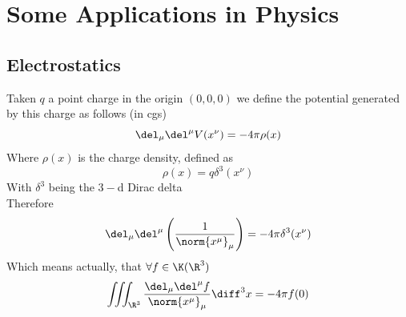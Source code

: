 \documentclass[../mmf.tex]{subfiles}
\begin{document}
\section{Some Applications in Physics}
\subsection{Electrostatics}
\begin{eg}
	Taken $q$ a point charge in the origin $(0,0,0)$ we define the potential generated by this charge as follows (in cgs)
	\begin{equation*}
		\del_\mu\del^\mu V(x^\nu)=-4\pi\rho(x)
	\end{equation*}
	Where $\rho(x)$ is the charge density, defined as
	\begin{equation*}
		\rho(x)=q\delta^3(x^\nu)
	\end{equation*}
	With $\delta^3$ being the $3-$d Dirac delta\\
	Therefore
	\begin{equation*}
		\del_\mu\del^\mu\left( \frac{1}{\norm{x^\mu}_\mu} \right)=-4\pi\delta^3(x^\nu)
	\end{equation*}
	Which means actually, that $\forall f\in\K(\R^3)$
	\begin{equation*}
		\iiint_{\R^3}\frac{\del_\mu\del^\mu f}{\norm{x^\mu}_\mu}\diff^3x=-4\pi f(0)
	\end{equation*}
\end{eg}
\end{document}
